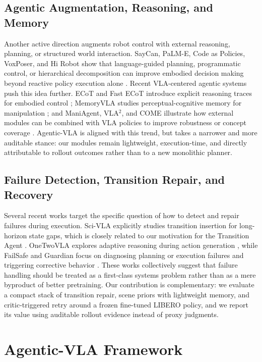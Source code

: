 \documentclass[a4paper]{Template/LaTeX_Templates/waica}
\begin{document}
\subsection{Agentic Augmentation, Reasoning, and Memory}

Another active direction augments robot control with external reasoning, planning, or structured world interaction. SayCan, PaLM-E, Code as Policies, VoxPoser, and Hi Robot show that language-guided planning, programmatic control, or hierarchical decomposition can improve embodied decision making beyond reactive policy execution alone \cite{saycan,palme,codeaspolicies,voxposer,hirobot}. Recent VLA-centered agentic systems push this idea further. ECoT and Fast ECoT introduce explicit reasoning traces for embodied control \cite{ecot,fastecot}; MemoryVLA studies perceptual-cognitive memory for manipulation \cite{memoryvla}; and ManiAgent, VLA$^2$, and COME illustrate how external modules can be combined with VLA policies to improve robustness or concept coverage \cite{maniagent,vla2,come}. Agentic-VLA is aligned with this trend, but takes a narrower and more auditable stance: our modules remain lightweight, execution-time, and directly attributable to rollout outcomes rather than to a new monolithic planner.

\subsection{Failure Detection, Transition Repair, and Recovery}

Several recent works target the specific question of how to detect and repair failures during execution. Sci-VLA explicitly studies transition insertion for long-horizon state gaps, which is closely related to our motivation for the Transition Agent \cite{scivla}. OneTwoVLA explores adaptive reasoning during action generation \cite{onetwovla}, while FailSafe and Guardian focus on diagnosing planning or execution failures and triggering corrective behavior \cite{failsafe,guardian}. These works collectively suggest that failure handling should be treated as a first-class systems problem rather than as a mere byproduct of better pretraining. Our contribution is complementary: we evaluate a compact stack of transition repair, scene priors with lightweight memory, and critic-triggered retry around a frozen fine-tuned LIBERO policy, and we report its value using auditable rollout evidence instead of proxy judgments.

\section{Agentic-VLA Framework}
\end{document}
